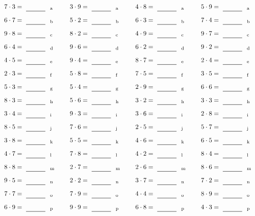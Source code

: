 \documentclass
[
  draft    = true,
  fontsize = 11pt,
  parskip  = half-
]
{scrartcl}
\begin{document}
\par\vfill\par
\begin{align*}
    \pline{7\cdot3}&=\rline{a}
  & \pline{3\cdot9}&=\rline{a}
  & \pline{4\cdot8}&=\rline{a}
  & \pline{5\cdot9}&=\rline{a} \\[1ex]
    \pline{6\cdot7}&=\rline{b}
  & \pline{5\cdot2}&=\rline{b}
  & \pline{6\cdot3}&=\rline{b}
  & \pline{7\cdot4}&=\rline{b} \\[1ex]
    \pline{9\cdot8}&=\rline{c}
  & \pline{8\cdot2}&=\rline{c}
  & \pline{4\cdot9}&=\rline{c}
  & \pline{9\cdot7}&=\rline{c} \\[1ex]
    \pline{6\cdot4}&=\rline{d}
  & \pline{9\cdot6}&=\rline{d}
  & \pline{6\cdot2}&=\rline{d}
  & \pline{9\cdot2}&=\rline{d} \\[1ex]
    \pline{4\cdot5}&=\rline{e}
  & \pline{9\cdot4}&=\rline{e}
  & \pline{8\cdot7}&=\rline{e}
  & \pline{2\cdot4}&=\rline{e} \\[1ex]
    \pline{2\cdot3}&=\rline{f}
  & \pline{5\cdot8}&=\rline{f}
  & \pline{7\cdot5}&=\rline{f}
  & \pline{3\cdot5}&=\rline{f} \\[1ex]
    \pline{5\cdot3}&=\rline{g}
  & \pline{5\cdot4}&=\rline{g}
  & \pline{2\cdot9}&=\rline{g}
  & \pline{6\cdot6}&=\rline{g} \\[1ex]
    \pline{8\cdot3}&=\rline{h}
  & \pline{5\cdot6}&=\rline{h}
  & \pline{3\cdot2}&=\rline{h}
  & \pline{3\cdot3}&=\rline{h} \\[1ex]
    \pline{3\cdot4}&=\rline{i}
  & \pline{9\cdot3}&=\rline{i}
  & \pline{3\cdot6}&=\rline{i}
  & \pline{2\cdot8}&=\rline{i} \\[1ex]
    \pline{8\cdot5}&=\rline{j}
  & \pline{7\cdot6}&=\rline{j}
  & \pline{2\cdot5}&=\rline{j}
  & \pline{5\cdot7}&=\rline{j} \\[1ex]
    \pline{3\cdot8}&=\rline{k}
  & \pline{5\cdot5}&=\rline{k}
  & \pline{4\cdot6}&=\rline{k}
  & \pline{6\cdot5}&=\rline{k} \\[1ex]
    \pline{4\cdot7}&=\rline{l}
  & \pline{7\cdot8}&=\rline{l}
  & \pline{4\cdot2}&=\rline{l}
  & \pline{8\cdot4}&=\rline{l} \\[1ex]
    \pline{8\cdot8}&=\rline{m}
  & \pline{2\cdot7}&=\rline{m}
  & \pline{2\cdot6}&=\rline{m}
  & \pline{8\cdot6}&=\rline{m} \\[1ex]
    \pline{9\cdot5}&=\rline{n}
  & \pline{2\cdot2}&=\rline{n}
  & \pline{3\cdot7}&=\rline{n}
  & \pline{7\cdot2}&=\rline{n} \\[1ex]
    \pline{7\cdot7}&=\rline{o}
  & \pline{7\cdot9}&=\rline{o}
  & \pline{4\cdot4}&=\rline{o}
  & \pline{8\cdot9}&=\rline{o} \\[1ex]
    \pline{6\cdot9}&=\rline{p}
  & \pline{9\cdot9}&=\rline{p}
  & \pline{6\cdot8}&=\rline{p}
  & \pline{4\cdot3}&=\rline{p}
\end{align*}
\end{document}
